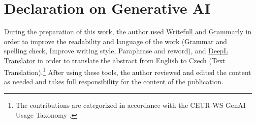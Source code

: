 \chapter*{Declaration on Generative AI}

During the preparation of this work, the author used
\href{https://www.writefull.com/}{Writefull} and \href{https://grammarly.com/}{Grammarly} in order to improve the readability and language of the work (Grammar and spelling check, Improve writing style, Paraphrase and reword), and
\href{https://www.deepl.com/}{DeepL Translator} in order to translate the abstract from English to Czech (Text Translation).\footnote{The contributions are categorized in accordance with the CEUR-WS GenAI Usage Taxonomy \cite{GenAITaxonomy}.}
After using these tools, the author reviewed and edited the content as needed and takes full responsibility for the content of the publication.
